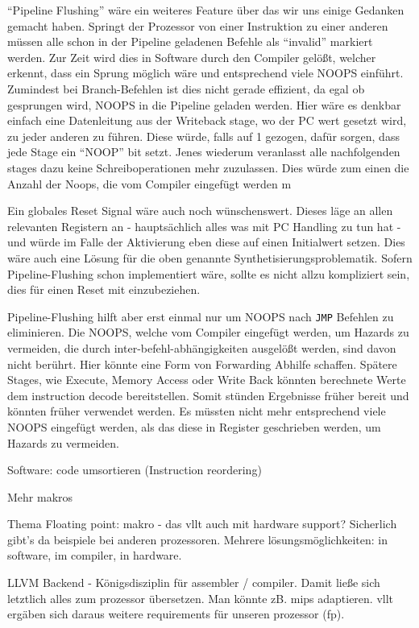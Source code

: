 \documentclass[paper=a4,fontsize=12pt,twocolumn]{scrreprt}
\begin{document}
\enquote{Pipeline Flushing} wäre ein weiteres Feature über das wir uns einige Gedanken gemacht haben.
Springt der Prozessor von einer Instruktion zu einer anderen müssen alle schon in der Pipeline geladenen Befehle als \enquote{invalid} markiert werden.
Zur Zeit wird dies in Software durch den Compiler gelößt, welcher erkennt, dass ein Sprung möglich wäre und entsprechend viele NOOPS einführt.
Zumindest bei Branch-Befehlen ist dies nicht gerade effizient, da egal ob gesprungen wird, NOOPS in die Pipeline geladen werden.
Hier wäre es denkbar einfach eine Datenleitung aus der Writeback stage, wo der PC wert gesetzt wird, zu jeder anderen zu führen.
Diese würde, falls auf 1 gezogen, dafür sorgen, dass jede Stage ein \enquote{NOOP} bit setzt.
Jenes wiederum veranlasst alle nachfolgenden stages dazu keine Schreiboperationen mehr zuzulassen.
Dies würde zum einen die Anzahl der Noops, die vom Compiler eingefügt werden m

Ein globales Reset Signal wäre auch noch wünschenswert.
Dieses läge an allen relevanten Registern an - hauptsächlich alles was mit PC Handling zu tun hat - und würde im Falle der Aktivierung eben diese auf einen Initialwert setzen.
Dies wäre auch eine Lösung für die oben genannte Synthetisierungsproblematik.
Sofern Pipeline-Flushing schon implementiert wäre, sollte es nicht allzu kompliziert sein, dies für einen Reset mit einzubeziehen.

Pipeline-Flushing hilft aber erst einmal nur um NOOPS nach \texttt{JMP} Befehlen zu eliminieren.
Die NOOPS, welche vom Compiler eingefügt werden, um Hazards zu vermeiden, die durch inter-befehl-abhängigkeiten ausgelößt werden, sind davon nicht berührt.
Hier könnte eine Form von Forwarding Abhilfe schaffen.
Spätere Stages, wie Execute, Memory Access oder Write Back könnten berechnete Werte dem instruction decode bereitstellen.
Somit stünden Ergebnisse früher bereit und könnten früher verwendet werden.
Es müssten nicht mehr entsprechend viele NOOPS eingefügt werden, als das diese in Register geschrieben werden, um Hazards zu vermeiden.

Software: code umsortieren (Instruction reordering)

Mehr makros

Thema Floating point: makro - das vllt auch mit hardware support?
Sicherlich gibt's da beispiele bei anderen prozessoren. Mehrere lösungsmöglichkeiten: in software, im compiler, in hardware.

LLVM Backend - Königsdisziplin für assembler / compiler.
Damit ließe sich letztlich alles zum prozessor übersetzen.
Man könnte zB. mips adaptieren.
vllt ergäben sich daraus weitere requirements für unseren prozessor (fp).
\end{document}
